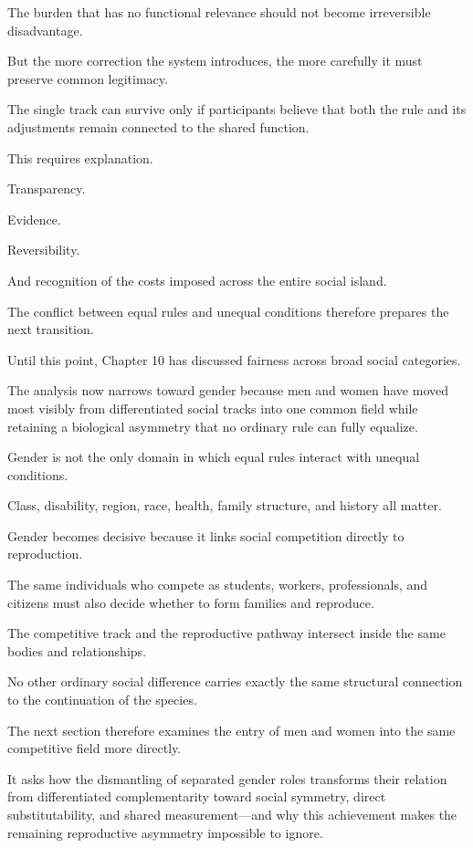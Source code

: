 The burden that has no functional relevance should not become irreversible disadvantage.

But the more correction the system introduces, the more carefully it must preserve common legitimacy.

The single track can survive only if participants believe that both the rule and its adjustments remain connected to the shared function.

This requires explanation.

Transparency.

Evidence.

Reversibility.

And recognition of the costs imposed across the entire social island.

The conflict between equal rules and unequal conditions therefore prepares the next transition.

Until this point, Chapter 10 has discussed fairness across broad social categories.

The analysis now narrows toward gender because men and women have moved most visibly from differentiated social tracks into one common field while retaining a biological asymmetry that no ordinary rule can fully equalize.

Gender is not the only domain in which equal rules interact with unequal conditions.

Class, disability, region, race, health, family structure, and history all matter.

Gender becomes decisive because it links social competition directly to reproduction.

The same individuals who compete as students, workers, professionals, and citizens must also decide whether to form families and reproduce.

The competitive track and the reproductive pathway intersect inside the same bodies and relationships.

No other ordinary social difference carries exactly the same structural connection to the continuation of the species.

The next section therefore examines the entry of men and women into the same competitive field more directly.

It asks how the dismantling of separated gender roles transforms their relation from differentiated complementarity toward social symmetry, direct substitutability, and shared measurement—and why this achievement makes the remaining reproductive asymmetry impossible to ignore.

